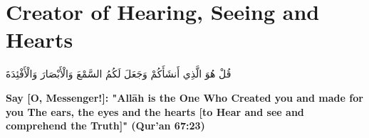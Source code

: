 \chapter{Creator of Hearing, Seeing and Hearts}
\begin{center}
    {\Huge    
        \begin{Arabic}
            قُلْ هُوَ الَّذِي أَنشَأَكُمْ وَجَعَلَ لَكُمُ السَّمْعَ وَالْأَبْصَارَ وَالْأَفْئِدَةَ
        \end{Arabic}
    }
\end{center}
\vspace*{\fill}
\vspace{3cm}
\begin{center}
    \large \textbf{Say [O, Messenger!]: "Allāh is the One Who Created you and made for you The ears, the eyes and the hearts [to Hear and see and comprehend the Truth]" (Qur'an 67:23)}
\end{center}

